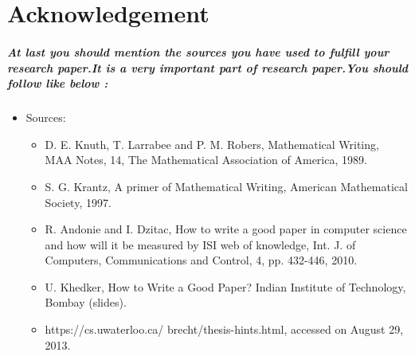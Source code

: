 \documentclass[20pt]{report}
\begin{document}
\chapter{Acknowledgement}
\paragraph{At last you should mention the sources you have used to fulfill your research paper.It is a very important part of research paper.You should follow like below :}
\begin{itemize}
\item Sources:
\begin{itemize}
\item D. E. Knuth, T. Larrabee and P. M. Robers, Mathematical
Writing, MAA Notes, 14, The Mathematical Association of
America, 1989.
\item S. G. Krantz, A primer of Mathematical Writing, American
Mathematical Society, 1997.
\item R. Andonie and I. Dzitac, How to write a good paper in
computer science and how will it be measured by ISI web of
knowledge, Int. J. of Computers, Communications and
Control, 4, pp. 432-446, 2010.
\item U. Khedker, How to Write a Good Paper? Indian Institute of
Technology, Bombay (slides).
\item https://cs.uwaterloo.ca/ brecht/thesis-hints.html, accessed
on August 29, 2013.
\end{itemize}
\end{itemize}
\end{document}
